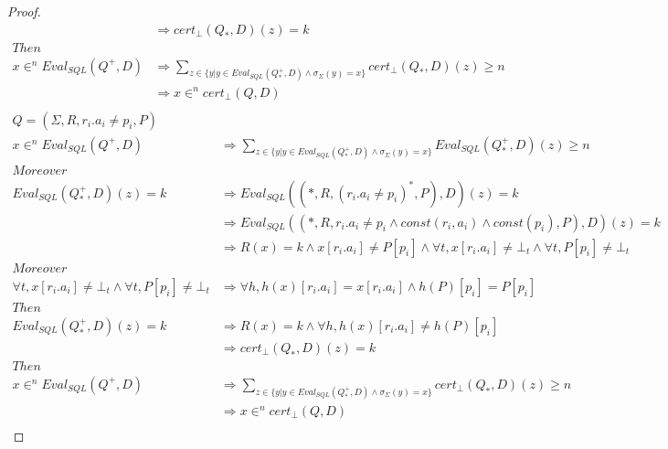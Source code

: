 \begin{proof}
\begin{align*}
		& \Rightarrow cert_\bot(Q_*,D)(z) = k \\
		Then \\
		x \in^n Eval_{SQL}(Q^+,D) & \Rightarrow \sum_{z \in \{y | y \in Eval_{SQL}(Q_*^+,D) \land \sigma_\Sigma(y) = x \} }{cert_\bot(Q_*,D)(z)} \geq n  \\
		& \Rightarrow x \in^n cert_\bot(Q,D) \\
	\end{align*}
	\begin{align*}
		Q = (\Sigma,R,r_i.a_i \neq p_i,P) \\
		x \in^n Eval_{SQL}(Q^+,D) & \Rightarrow \sum_{z \in \{y | y \in Eval_{SQL}(Q_*^+,D) \land \sigma_\Sigma(y) = x \} }{Eval_{SQL}(Q_*^+,D)(z)} \geq n  \\
		Moreover\\
		Eval_{SQL}(Q^+_*,D)(z)  = k & \Rightarrow  Eval_{SQL}((*,R,(r_i.a_i \neq p_i )^*,P),D)(z)  = k \\
		& \Rightarrow Eval_{SQL}((*,R,r_i.a_i \neq p_i \land const(r_i,a_i) \land const(p_i),P),D)(z)  = k \\
		& \Rightarrow R(x) = k \land x[r_i.a_i] \neq P[p_i] \land \forall t, x[r_i.a_i] \neq \bot_t \land \forall t, P[p_i] \neq \bot_t \\
		Moreover \\
		\forall t, x[r_i.a_i] \neq \bot_t \land \forall t, P[p_i] \neq \bot_t & \Rightarrow \forall h, h(x)[r_i.a_i] = x[r_i.a_i] \land h(P)[p_i] = P[p_i] \\
		Then \\
		Eval_{SQL}(Q^+_*,D)(z)  = k & \Rightarrow R(x) = k \land \forall h, h(x)[r_i.a_i] \neq h(P)[p_i] \\
		& \Rightarrow cert_\bot(Q_*,D)(z) = k \\
		Then \\
		x \in^n Eval_{SQL}(Q^+,D) & \Rightarrow \sum_{z \in \{y | y \in Eval_{SQL}(Q_*^+,D) \land \sigma_\Sigma(y) = x \} }{cert_\bot(Q_*,D)(z)} \geq n  \\
		& \Rightarrow x \in^n cert_\bot(Q,D) \\
	\end{align*}
\end{proof}

